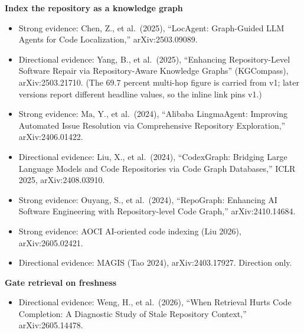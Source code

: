 \textbf{Index the repository as a knowledge graph}

\begin{itemize}
\tightlist
\item
  Strong evidence: Chen, Z., et al.~(2025), ``LocAgent: Graph-Guided LLM Agents for Code Localization,'' arXiv:2503.09089.
\item
  Directional evidence: Yang, B., et al.~(2025), ``Enhancing Repository-Level Software Repair via Repository-Aware Knowledge Graphs'' (KGCompass), arXiv:2503.21710. (The 69.7 percent multi-hop figure is carried from v1; later versions report different headline values, so the inline link pins v1.)
\item
  Strong evidence: Ma, Y., et al.~(2024), ``Alibaba LingmaAgent: Improving Automated Issue Resolution via Comprehensive Repository Exploration,'' arXiv:2406.01422.
\item
  Directional evidence: Liu, X., et al.~(2024), ``CodexGraph: Bridging Large Language Models and Code Repositories via Code Graph Databases,'' ICLR 2025, arXiv:2408.03910.
\item
  Strong evidence: Ouyang, S., et al.~(2024), ``RepoGraph: Enhancing AI Software Engineering with Repository-level Code Graph,'' arXiv:2410.14684.
\item
  Strong evidence: AOCI AI-oriented code indexing (Liu 2026), arXiv:2605.02421.
\item
  Directional evidence: MAGIS (Tao 2024), arXiv:2403.17927. Direction only.
\end{itemize}

\textbf{Gate retrieval on freshness}

\begin{itemize}
\tightlist
\item
  Directional evidence: Weng, H., et al.~(2026), ``When Retrieval Hurts Code Completion: A Diagnostic Study of Stale Repository Context,'' arXiv:2605.14478.
\end{itemize}
